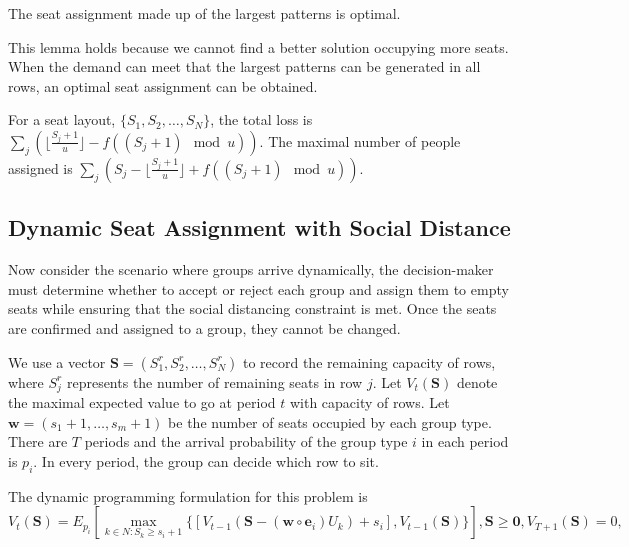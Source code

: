 \begin{lem}
The seat assignment made up of the largest patterns is optimal.
\end{lem}

This lemma holds because we cannot find a better solution occupying more seats. When the demand can meet that the largest patterns can be generated in all rows, an optimal seat assignment can be obtained.

\begin{prop}
For a seat layout, $\{S_1, S_2, \ldots, S_{N}\}$, the total loss is $\sum_{j} (\lfloor \frac{S_j+1}{u}  \rfloor - f((S_j +1)\mod u))$. The maximal number of people assigned is $\sum_{j} (S_j - \lfloor \frac{S_j+1}{u} \rfloor + f((S_j +1)\mod u))$.
\end{prop}

\subsection{Dynamic Seat Assignment with Social Distance}


Now consider the scenario where groups arrive dynamically, the decision-maker must determine whether to accept or reject each group and assign them to empty seats while ensuring that the social distancing constraint is met. Once the seats are confirmed and assigned to a group, they cannot be changed.

We use a vector $\mathbf{S}= (S^{r}_1, S^{r}_2, \ldots, S^{r}_{N})$ to record the remaining capacity of rows, where $S^{r}_{j}$ represents the number of remaining seats in row $j$. Let $V_{t}(\mathbf{S})$ denote the maximal expected value to go at period $t$ with capacity of rows. Let $\mathbf{w} = (s_1+1, \ldots, s_m+1)$ be the number of seats occupied by each group type. There are $T$ periods and the arrival probability of the group type $i$ in each period is $p_i$. In every period, the group can decide which row to sit.

The dynamic programming formulation for this problem is
$$V_{t}(\mathbf{S}) = E_{p_i} \left[ \max_{k \in N: S_k \geq s_i +1} \{ {[V_{t-1}(\mathbf{S}- (\mathbf{w} \circ \mathbf{e}_{i})U_{k})+ s_i]}, {V_{t-1}(\mathbf{S})}\} \right], \mathbf{S} \geq \mathbf{0}, V_{T+1}(\mathbf{S}) = 0,$$

